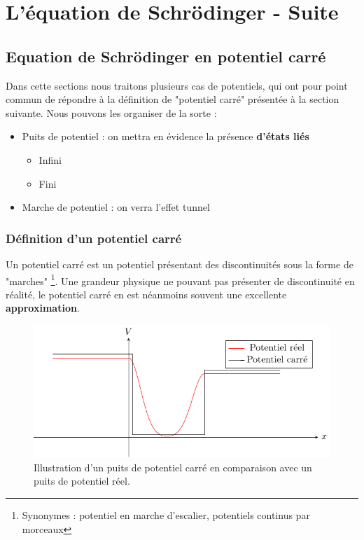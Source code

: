 \documentclass{book}
\begin{document}
\chapter{L'équation de Schrödinger - Suite}\label{chap:chap3}



\section{Equation de Schrödinger en potentiel carré}
Dans cette sections nous traitons plusieurs cas de potentiels, qui ont pour point commun de répondre à la définition de "potentiel carré" présentée à la section suivante. Nous pouvons les organiser de la sorte :
\begin{itemize}
  \item Puits de potentiel : on mettra en évidence la présence \textbf{d'états liés}
    \begin{itemize}%
      \item Infini
      \item Fini
    \end{itemize}
  \item Marche de potentiel : on verra l'effet tunnel
\end{itemize}
\subsection{Définition d'un potentiel carré} \label{ch2-subsection-Definition_pot_carre}
Un potentiel carré est un potentiel présentant des discontinuités sous la forme de "marches" \footnote{Synonymes : potentiel en marche d'escalier, potentiels continus par morceaux}. Une grandeur physique ne pouvant pas présenter de discontinuité en réalité, le potentiel carré en est néanmoins souvent une excellente \textbf{approximation}.




\begin{figure}[h]
\centering
\includegraphics[width=0.5\linewidth]{images/pot_carre.pdf}
\caption{Illustration d'un puits de potentiel carré en comparaison avec un puits de potentiel réel.}
\label{fig:potentiel_carre}
\end{figure}
\end{document}
